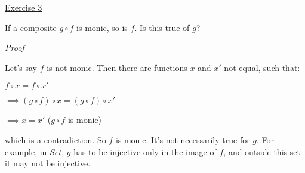 \noindent
\underline{Exercise 3}
\vspace{2mm}

If a composite $g \circ f$ is monic, so is $f$. Is this true of $g$?

\vspace{2mm}

\noindent
\emph{Proof}

Let's say $f$ is not monic. Then there are functions $x$ and $x'$ not equal, such that:

$f \circ x = f \circ x'$

$\implies (g \circ f) \circ x = (g \circ f) \circ x'$

$\implies x = x'$ ($g \circ f$ is monic)

which is a contradiction. So $f$ is monic. It's not necessarily true for $g$. For example, in $Set$, $g$ has to be injective only in the image of $f$, and outside this set it may not be injective.

\vspace{2mm}
